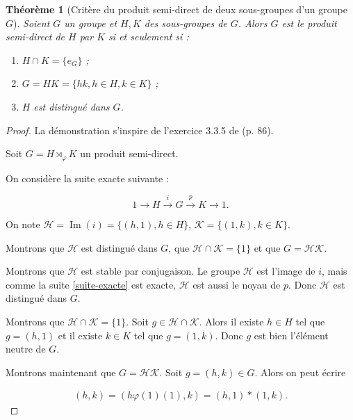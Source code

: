 \documentclass[french]{report}
\newtheorem{theorem}{Théorème}
\begin{document}
\begin{theorem}[Critère du produit semi-direct de deux sous-groupes d'un groupe $G$]\label{critere_semi_direct}
  Soient $G$ un groupe et $H, K$ des sous-groupes de $G$. Alors $G$ est le produit semi-direct de $H$ par $K$ si et seulement si :

  \begin{enumerate}
    \item $H \cap K = \{ e_G \} $ ;
    \item $G = HK = \{ hk, h \in H, k \in K \} $ ;
    \item $H$ est distingué dans $G$.
  \end{enumerate}
\end{theorem}

\begin{proof}

La démonstration s'inspire de l'exercice 3.3.5 de \cite{theorie_groupes} (p. 86).

Soit $G = H \rtimes _{\varphi} K$ un produit semi-direct.

On considère la suite exacte suivante :

\begin{equation}\label{suite-exacte}
  1 \longrightarrow H \stackrel{i}{\longrightarrow} G \stackrel{p}{\longrightarrow} K \longrightarrow 1.
\end{equation}

On note $\mathcal{H}  = \operatorname{Im}(i) = \{ (h,1), h \in H\} $, $\mathcal{K}  = \{ (1, k), k \in K \} $.

Montrons que $\mathcal{H} $ est distingué dans $G$, que $\mathcal{H} \cap \mathcal{K} = \{ 1 \}  $ et que $G = \mathcal{H} \mathcal{K}  $.

Montrons que $\mathcal{H} $ est stable par conjugaison. Le groupe $\mathcal{H} $ est l'image de $i$, mais comme la suite \ref{suite-exacte} est exacte, $\mathcal{H} $ est aussi le noyau de $p$. Donc $\mathcal{H} $ est distingué dans $G$.


Montrons que $\mathcal{H} \cap \mathcal{K} = \{ 1 \}  $. Soit $g \in \mathcal{H} \cap \mathcal{K}$. Alors il existe $h \in H$ tel que $g = (h,1)$ et il existe $k \in K$ tel que $g=(1, k)$. Donc $g$ est bien l'élément neutre de $G$.

Montrons maintenant que $G  = \mathcal{H} \mathcal{K} $. Soit $g =(h,k) \in G$. Alors on peut écrire

\begin{gather*}
  (h,k) = (h \varphi(1)(1), k) = (h,1)*(1,k).
\end{gather*}


\end{proof}
\end{document}
